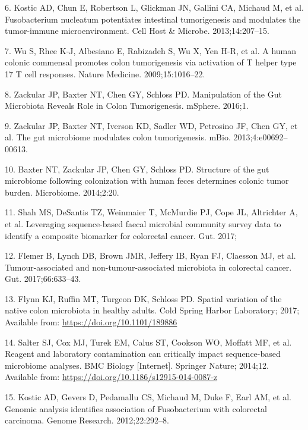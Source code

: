 \documentclass[12pt,]{article}
\begin{document}
\hypertarget{ref-kostic_fusobacterium_2013}{}
6. Kostic AD, Chun E, Robertson L, Glickman JN, Gallini CA, Michaud M,
et al. Fusobacterium nucleatum potentiates intestinal tumorigenesis and
modulates the tumor-immune microenvironment. Cell Host \& Microbe.
2013;14:207--15.

\hypertarget{ref-wu_human_2009}{}
7. Wu S, Rhee K-J, Albesiano E, Rabizadeh S, Wu X, Yen H-R, et al. A
human colonic commensal promotes colon tumorigenesis via activation of T
helper type 17 T cell responses. Nature Medicine. 2009;15:1016--22.

\hypertarget{ref-zackular_manipulation_2016}{}
8. Zackular JP, Baxter NT, Chen GY, Schloss PD. Manipulation of the Gut
Microbiota Reveals Role in Colon Tumorigenesis. mSphere. 2016;1.

\hypertarget{ref-zackular_gut_2013}{}
9. Zackular JP, Baxter NT, Iverson KD, Sadler WD, Petrosino JF, Chen GY,
et al. The gut microbiome modulates colon tumorigenesis. mBio.
2013;4:e00692--00613.

\hypertarget{ref-baxter_structure_2014}{}
10. Baxter NT, Zackular JP, Chen GY, Schloss PD. Structure of the gut
microbiome following colonization with human feces determines colonic
tumor burden. Microbiome. 2014;2:20.

\hypertarget{ref-shah_leveraging_2017}{}
11. Shah MS, DeSantis TZ, Weinmaier T, McMurdie PJ, Cope JL, Altrichter
A, et al. Leveraging sequence-based faecal microbial community survey
data to identify a composite biomarker for colorectal cancer. Gut. 2017;

\hypertarget{ref-flemer_tumour-associated_2017}{}
12. Flemer B, Lynch DB, Brown JMR, Jeffery IB, Ryan FJ, Claesson MJ, et
al. Tumour-associated and non-tumour-associated microbiota in colorectal
cancer. Gut. 2017;66:633--43.

\hypertarget{ref-Flynn_preprint_2017}{}
13. Flynn KJ, Ruffin MT, Turgeon DK, Schloss PD. Spatial variation of
the native colon microbiota in healthy adults. Cold Spring Harbor
Laboratory; 2017; Available from: \url{https://doi.org/10.1101/189886}

\hypertarget{ref-Salter_contamination_2014}{}
14. Salter SJ, Cox MJ, Turek EM, Calus ST, Cookson WO, Moffatt MF, et
al. Reagent and laboratory contamination can critically impact
sequence-based microbiome analyses. BMC Biology {[}Internet{]}. Springer
Nature; 2014;12. Available from:
\url{https://doi.org/10.1186/s12915-014-0087-z}

\hypertarget{ref-kostic_genomic_2012}{}
15. Kostic AD, Gevers D, Pedamallu CS, Michaud M, Duke F, Earl AM, et
al. Genomic analysis identifies association of Fusobacterium with
colorectal carcinoma. Genome Research. 2012;22:292--8.
\end{document}
